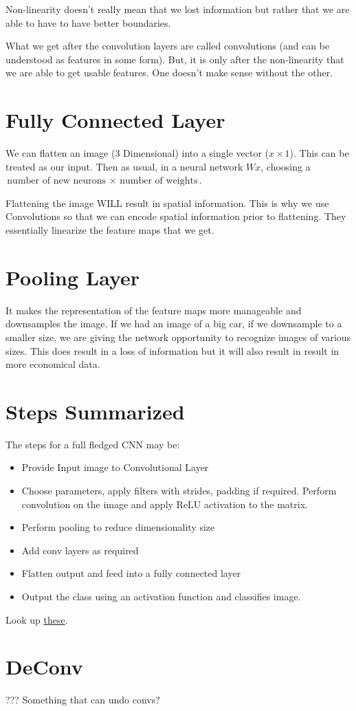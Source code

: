 Non-linearity doesn't really mean that we lost information but rather that we are able to have to have better boundaries.

What we get after the convolution layers are called convolutions (and can be understood as features in some form). But, it is only after the non-linearity that we are able to get usable features. One doesn't make sense without the other.

\section{Fully Connected Layer}

We can flatten an image (3 Dimensional) into a single vector ($x \times 1$). This can be treated as our input. Then as usual, in a neural network $Wx$, choosing a \textit{$\text{number of new neurons } \times \text{ number of weights}$}.

Flattening the image WILL result in spatial information. This is why we use Convolutions so that we can encode spatial information prior to flattening. They essentially linearize the feature maps that we get.

\section{Pooling Layer}

It makes the representation of the feature maps more manageable and downsamples the image. If we had an image of a big car, if we downsample to a smaller size, we are giving the network opportunity to recognize images of various sizes. This does result in a loss of information but it will also result in result in more economical data.

\section{Steps Summarized}

The steps for a full fledged CNN may be:

\begin{itemize}
    \item Provide Input image to Convolutional Layer
    \item Choose parameters, apply filters with strides, padding if required. Perform convolution on the image and apply ReLU activation to the matrix.
    \item Perform pooling to reduce dimensionality size
    \item Add conv layers as required
    \item Flatten output and feed into a fully connected layer
    \item Output the class using an activation function and classifies image.
\end{itemize}

Look up \href{https://dzone.com/articles/the-9-deep-learning-papers-you-need-to-know-about-1}{these}.

\section{DeConv}

??? Something that can undo convs?